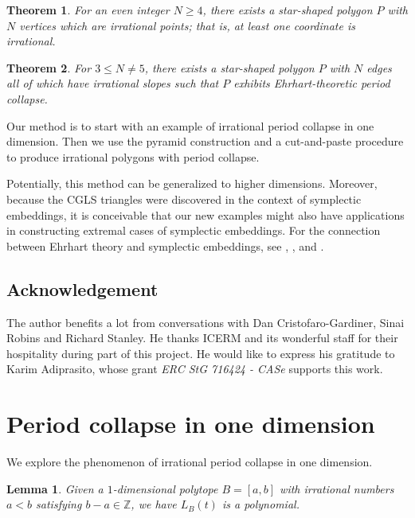 \documentclass[a4paper]{article}
\newtheorem{thm}{Theorem}
\newtheorem{lem}{Lemma}
\begin{document}
\begin{thm}\label{thm:vertex}
	For an even integer $N \geq 4$, there exists a star-shaped polygon $P$ with $N$ vertices which are irrational points; that is, at least one coordinate is irrational.
\end{thm}

\begin{thm}\label{thm:edge}
	For $3 \leq N \neq 5$, there exists a star-shaped polygon $P$ with $N$ edges all of which have irrational slopes such that $P$ exhibits Ehrhart-theoretic period collapse.
\end{thm}

Our method is to start with an example of irrational period collapse in one dimension. Then we use the pyramid construction and a cut-and-paste procedure to produce irrational polygons with period collapse.

Potentially, this method can be generalized to higher dimensions. Moreover, because the CGLS triangles were discovered in the context of symplectic embeddings, it is conceivable that our new examples might also have applications in constructing extremal cases of symplectic embeddings. For the connection between Ehrhart theory and symplectic embeddings, see \cite{mcduff2012embedding}, \cite{cristofaro2013ehrhart}, \cite{cristofaro2018ghost} and \cite{schlenk2018symplectic}.

\subsection*{Acknowledgement}
The author benefits a lot from conversations with Dan Cristofaro-Gardiner, Sinai Robins and Richard Stanley. He thanks ICERM and its wonderful staff for their hospitality during part of this project. He would like to express his gratitude to Karim Adiprasito, whose grant \textit{ERC StG 716424 - CASe} supports this work.

\section{Period collapse in one dimension}
We explore the phenomenon of irrational period collapse in one dimension.

\begin{lem}
	Given a $1$-dimensional polytope $B = [a,b]$ with irrational numbers $a < b$ satisfying $b-a \in \mathbb{Z}$, we have $L_{B}(t)$ is a polynomial.
\end{lem}
\end{document}
